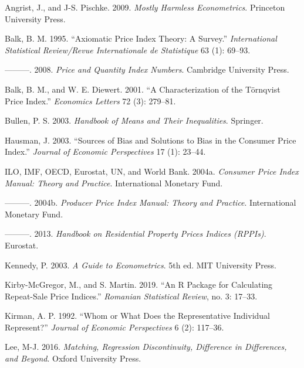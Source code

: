 \documentclass[]{article}
\begin{document}
\hypertarget{refs}{}
\leavevmode\hypertarget{ref-angrist2009}{}%
Angrist, J., and J-S. Pischke. 2009. \emph{Mostly Harmless Econometrics}. Princeton University Press.

\leavevmode\hypertarget{ref-balk1995}{}%
Balk, B. M. 1995. ``Axiomatic Price Index Theory: A Survey.'' \emph{International Statistical Review/Revue Internationale de Statistique} 63 (1): 69--93.

\leavevmode\hypertarget{ref-balk2008}{}%
---------. 2008. \emph{Price and Quantity Index Numbers}. Cambridge University Press.

\leavevmode\hypertarget{ref-balk2001}{}%
Balk, B. M., and W. E. Diewert. 2001. ``A Characterization of the Törnqvist Price Index.'' \emph{Economics Letters} 72 (3): 279--81.

\leavevmode\hypertarget{ref-bullen2003}{}%
Bullen, P. S. 2003. \emph{Handbook of Means and Their Inequalities}. Springer.

\leavevmode\hypertarget{ref-hausman2003}{}%
Hausman, J. 2003. ``Sources of Bias and Solutions to Bias in the Consumer Price Index.'' \emph{Journal of Economic Perspectives} 17 (1): 23--44.

\leavevmode\hypertarget{ref-cpimanual}{}%
ILO, IMF, OECD, Eurostat, UN, and World Bank. 2004a. \emph{Consumer Price Index Manual: Theory and Practice}. International Monetary Fund.

\leavevmode\hypertarget{ref-ppimanual}{}%
---------. 2004b. \emph{Producer Price Index Manual: Theory and Practice}. International Monetary Fund.

\leavevmode\hypertarget{ref-rppihandbook}{}%
---------. 2013. \emph{Handbook on Residential Property Prices Indices (RPPIs)}. Eurostat.

\leavevmode\hypertarget{ref-kennedy2003}{}%
Kennedy, P. 2003. \emph{A Guide to Econometrics}. 5th ed. MIT University Press.

\leavevmode\hypertarget{ref-kirbymcgregor2019}{}%
Kirby-McGregor, M., and S. Martin. 2019. ``An R Package for Calculating Repeat-Sale Price Indices.'' \emph{Romanian Statistical Review}, no. 3: 17--33.

\leavevmode\hypertarget{ref-kirman1992}{}%
Kirman, A. P. 1992. ``Whom or What Does the Representative Individual Represent?'' \emph{Journal of Economic Perspectives} 6 (2): 117--36.

\leavevmode\hypertarget{ref-lee2016}{}%
Lee, M-J. 2016. \emph{Matching, Regression Discontinuity, Difference in Differences, and Beyond}. Oxford University Press.
\end{document}
